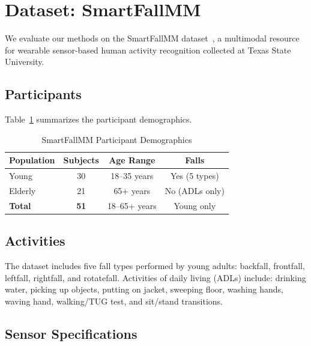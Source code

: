 \documentclass[journal,12pt]{IEEEtran}
\begin{document}

\section{Dataset: SmartFallMM}
\label{sec:dataset}

We evaluate our methods on the SmartFallMM dataset~\cite{smartfallmm}, a multimodal resource for wearable sensor-based human activity recognition collected at Texas State University.

\subsection{Participants}

Table~\ref{tab:participants} summarizes the participant demographics.

\begin{table}[htbp]
\centering
\caption{SmartFallMM Participant Demographics}
\label{tab:participants}
\begin{tabular}{@{}lccc@{}}
\toprule
\textbf{Population} & \textbf{Subjects} & \textbf{Age Range} & \textbf{Falls} \\
\midrule
Young & 30 & 18--35 years & Yes (5 types) \\
Elderly & 21 & 65+ years & No (ADLs only) \\
\midrule
\textbf{Total} & \textbf{51} & 18--65+ years & Young only \\
\bottomrule
\end{tabular}
\end{table}

\subsection{Activities}

The dataset includes five fall types performed by young adults: backfall, frontfall, leftfall, rightfall, and rotatefall. Activities of daily living (ADLs) include: drinking water, picking up objects, putting on jacket, sweeping floor, washing hands, waving hand, walking/TUG test, and sit/stand transitions.

\subsection{Sensor Specifications}
\end{document}
